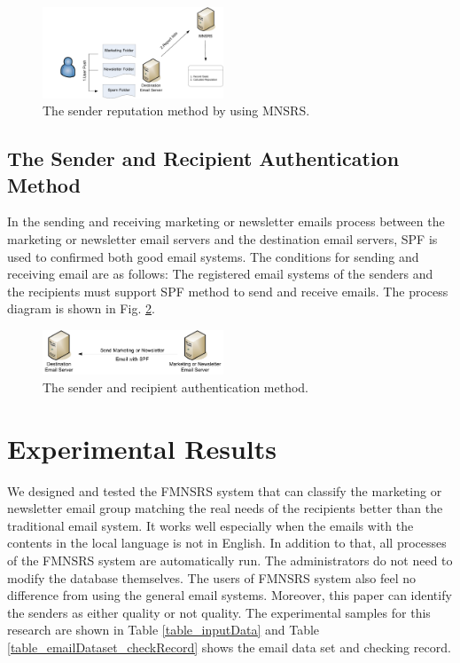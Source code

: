 \documentclass[conference]{IEEEtran}
\begin{document}
\begin{figure}
\centering
\includegraphics[width=0.48\textwidth]{6.pdf}
\caption{The sender reputation method by using MNSRS.}
\label{fig:ReputationMethod}
\end{figure}

\subsection{The Sender and Recipient Authentication Method}

In the sending and receiving marketing or newsletter emails process between the marketing or newsletter email servers and the destination email servers, SPF \cite{wong,NguyenTuanAnh,Seike} is used to confirmed both good email systems.
%
The conditions for sending and receiving email are as follows:
The registered email systems of the senders and the recipients must support SPF method to send and receive emails.
%
The process diagram is shown in Fig. \ref{fig:AuthenticationMethod}.

\begin{figure}
\centering
\includegraphics[width=0.48\textwidth]{7.pdf}
\caption{The sender and recipient authentication method.}
\label{fig:AuthenticationMethod}
\end{figure}

\section{Experimental Results}

We designed and tested the FMNSRS system that can classify the marketing or newsletter email group matching the real needs of the recipients better than the traditional email system.
%
It works well especially when the emails with the contents in the local language is not in English.
%
In addition to that, all processes of the FMNSRS system are automatically run.
%
The administrators do not need to modify the database themselves. 
%
The users of FMNSRS system also feel no difference from using the general email systems.
% 
Moreover, this paper can identify the senders as either quality or not quality.
%
The experimental samples for this research are shown in Table \ref{table_inputData} and Table \ref{table_emailDataset_checkRecord} shows the email data set and checking record.
\end{document}

